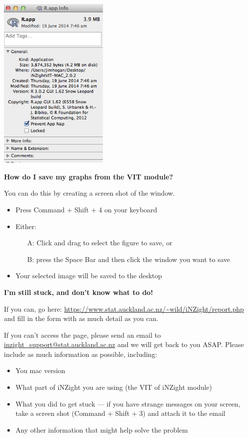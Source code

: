 \documentclass[10pt,a4paper,twoside]{article}
\begin{document}
\begin{center}
  \includegraphics[width=0.4\textwidth]{fig/mavericks/preventappnap.png}
\end{center}


\vspace{1em}
\textbf{How do I save my graphs from the VIT module?}

You can do this by creating a screen shot of the window.
\begin{itemize}
\item Press Command + Shift + 4 on your keyboard
\item Either:
  \begin{itemize}
  \item[A:] Click and drag to select the figure to save, or
  \item[B:] press the Space Bar and then click the window you want to save
  \end{itemize}
\item Your selected image will be saved to the desktop
\end{itemize}


\vspace{1em}
\textbf{I'm still stuck, and don't know what to do!}

If you can, go here: \url{https://www.stat.auckland.ac.nz/~wild/iNZight/report.php} and
fill in the form with as much detail as you can.

If you can't access the page, please send an email to
\href{mailto:inzight\_support@stat.auckland.ac.nz}{inzight\_support@stat.auckland.ac.nz}
and we will get back to you ASAP. Please include as much information as possible,
including:
\begin{itemize}
\item You mac version
\item What part of iNZight you are using (the VIT of iNZight module)
\item What you did to get stuck --- if you have strange messages on your screen, take a
  screen shot (Command + Shift + 3) and attach it to the email
\item Any other information that might help solve the problem
\end{itemize}
\end{document}
